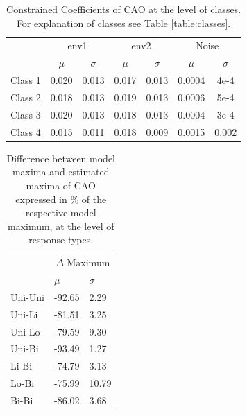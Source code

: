 			\vspace{10em}
		
			\begin{table}[h!]
				 	
				\normalsize
				\caption{Constrained Coefficients of CAO at the level of classes. For explanation of classes see Table \ref{table:classes}.}
				\centering
			
				\begin{tabular}{@{}lcccccc@{}}
					\toprule
					& \multicolumn{2}{c}{env1} & \multicolumn{2}{c}{env2} & \multicolumn{2}{c}{Noise}\\\cmidrule(l){2-3} \cmidrule(l){4-5} \cmidrule(l){6-7}
					& $\mu$ & $\sigma$ & $\mu$ & $\sigma$ & $\mu$ & $\sigma$\\
					\hline
					Class 1 & 0.020 & 0.013 & 0.017 & 0.013 & 0.0004 & 4e-4 \\
					Class 2 & 0.018 & 0.013 & 0.019 & 0.013 & 0.0006 & 5e-4 \\
					Class 3 & 0.020 & 0.013 & 0.018 & 0.013 & 0.0004 & 3e-4 \\
					Class 4 & 0.015 & 0.011 & 0.018 & 0.009 & 0.0015 & 0.002 \\
					\toprule
				\end{tabular}
			
				\label{tab:caosm2}
			
			\end{table}
		
			\vspace{10em}
		
			\begin{table}[h!]  
			
				\normalsize
				\caption{Difference between model maxima and estimated maxima of CAO expressed in \% of the respective model maximum, at the level of response types.}
				\centering
				
				\begin{tabular}{@{}lll@{}}
					\toprule
					& \multicolumn{2}{c}{$\Delta$ Maximum} \\ \cmidrule{2-3}
					& $\mu$   & $\sigma$   \\
					\hline
					Uni-Uni & -92.65 & 2.29  \\
					Uni-Li  & -81.51 & 3.25  \\
					Uni-Lo  & -79.59 & 9.30  \\
					Uni-Bi  & -93.49 & 1.27  \\
					Li-Bi   & -74.79 & 3.13  \\
					Lo-Bi   & -75.99 & 10.79 \\
					Bi-Bi   & -86.02 & 3.68  \\
					\toprule 
				\end{tabular}
				
				\label{tab:caosm3}
			
			\end{table}
		
